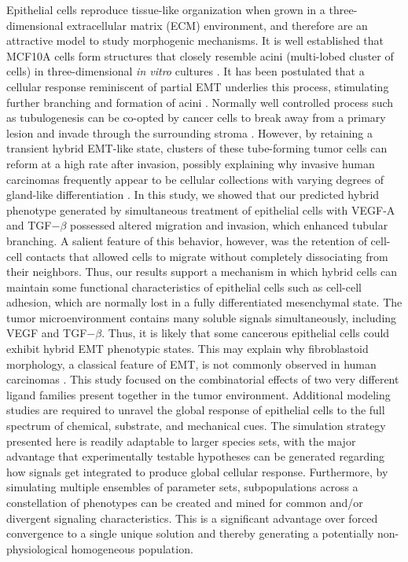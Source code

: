 \documentclass[12pt]{article}
\begin{document}
Epithelial cells reproduce tissue-like organization when grown in a three-dimensional extracellular matrix (ECM) environment, and therefore are an attractive model to study morphogenic mechanisms.
It is well established that MCF10A cells form structures that closely resemble acini (multi-lobed cluster of cells) in three-dimensional \emph{in vitro} cultures \citep{Debnath2003}.
It has been postulated that a cellular response reminiscent of partial EMT underlies this process, stimulating further branching and formation of acini \citep{Pearson:2007qq}.
Normally well controlled process such as tubulogenesis can be co-opted by cancer cells to break away from a primary lesion and invade through the surrounding stroma \citep{OBrien2004}.
However, by retaining a transient hybrid EMT-like state, clusters of these tube-forming tumor cells can reform at a high rate after invasion, possibly explaining why invasive human carcinomas frequently appear to be cellular collections with varying degrees of gland-like differentiation \citep{Debnath:2005qc}.
In this study, we showed that our predicted hybrid phenotype generated by simultaneous treatment of epithelial cells with VEGF-A and TGF$-\beta$ possessed altered migration and invasion, which enhanced tubular branching.
A salient feature of this behavior, however, was the retention of cell-cell contacts that allowed cells to migrate without completely dissociating from their neighbors.
Thus, our results support a mechanism in which hybrid cells can maintain some functional characteristics of epithelial cells such as cell-cell adhesion, which are normally lost in a fully differentiated mesenchymal state. The tumor microenvironment contains many soluble signals simultaneously, including VEGF and TGF$-\beta$.
Thus, it is likely that some cancerous epithelial cells could exhibit hybrid EMT phenotypic states.
This may explain why fibroblastoid morphology, a classical feature of EMT, is not commonly observed in human carcinomas \citep{Debnath:2005qc}.
This study focused on the combinatorial effects of two very different ligand families present together in the tumor environment.
Additional modeling studies are required to unravel the global response of epithelial cells to the full spectrum of chemical, substrate, and mechanical cues.
The simulation strategy presented here is readily adaptable to larger species sets, with the major advantage that experimentally testable hypotheses can be generated regarding how signals get integrated to produce global cellular response. Furthermore, by simulating multiple ensembles of parameter sets, subpopulations across a constellation of phenotypes can be created and mined for common and/or divergent signaling characteristics.
This is a significant advantage over forced convergence to a single unique solution and thereby generating a potentially non-physiological homogeneous population.
\end{document}
